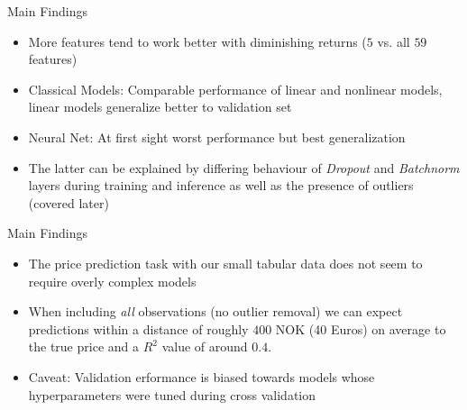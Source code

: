 \documentclass[ngerman,inputenc]{beamer}
\begin{document}
\begin{frame}{Main Findings}
  \begin{itemize}
    \item More features tend to work better with diminishing returns ($5$ vs. all $59$ features)
    \item Classical Models: Comparable performance of linear and nonlinear models, linear models generalize better to validation set
    \item Neural Net: At first sight worst performance but best generalization
    \item The latter can be explained by differing behaviour of \emph{Dropout} and \emph{Batchnorm} layers during training and inference as well as the presence of outliers (covered later)
  \end{itemize}
\end{frame}

\begin{frame}{Main Findings}
  \begin{itemize}
    \item The price prediction task with our small tabular data does not seem to require overly complex models
    \item When including \emph{all} observations (no outlier removal) we can expect predictions within a distance of roughly $400$ NOK (40 Euros) on average to the true price and a $R^2$ value of around $0.4$.
    \item Caveat: Validation erformance is biased towards models whose hyperparameters were tuned during cross validation
  \end{itemize}
\end{frame}
\end{document}
